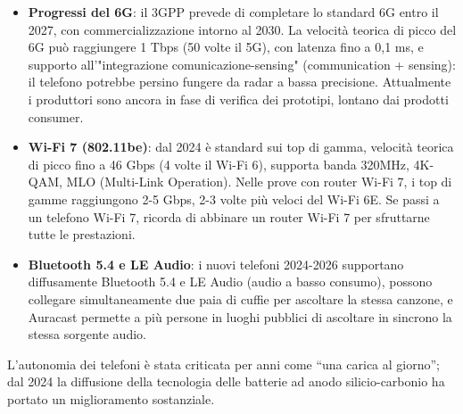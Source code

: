 \begin{itemize}
  \item \textbf{Progressi del 6G}: il 3GPP prevede di completare lo standard 6G entro il 2027, con commercializzazione intorno al 2030. La velocità teorica di picco del 6G può raggiungere 1 Tbps (50 volte il 5G), con latenza fino a 0,1 ms, e supporto all'"integrazione comunicazione-sensing" (communication + sensing): il telefono potrebbe persino fungere da radar a bassa precisione. Attualmente i produttori sono ancora in fase di verifica dei prototipi, lontano dai prodotti consumer.
  \item \textbf{Wi-Fi 7 (802.11be)}: dal 2024 è standard sui top di gamma, velocità teorica di picco fino a 46 Gbps (4 volte il Wi-Fi 6), supporta banda 320MHz, 4K-QAM, MLO (Multi-Link Operation). Nelle prove con router Wi-Fi 7, i top di gamme raggiungono 2-5 Gbps, 2-3 volte più veloci del Wi-Fi 6E. Se passi a un telefono Wi-Fi 7, ricorda di abbinare un router Wi-Fi 7 per sfruttarne tutte le prestazioni.
  \item \textbf{Bluetooth 5.4 e LE Audio}: i nuovi telefoni 2024-2026 supportano diffusamente Bluetooth 5.4 e LE Audio (audio a basso consumo), possono collegare simultaneamente due paia di cuffie per ascoltare la stessa canzone, e Auracast permette a più persone in luoghi pubblici di ascoltare in sincrono la stessa sorgente audio.
\end{itemize}


L'autonomia dei telefoni è stata criticata per anni come “una carica al giorno”; dal 2024 la diffusione della tecnologia delle batterie ad anodo silicio-carbonio ha portato un miglioramento sostanziale.

